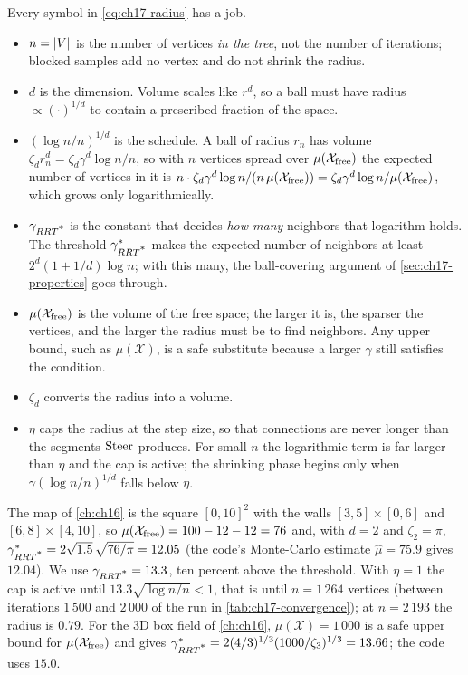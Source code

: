 Every symbol in \cref{eq:ch17-radius} has a job.
\begin{itemize}
  \item $n=\left\lvert V \right\rvert$ is the number of vertices \emph{in the tree}, not the
  number of iterations; blocked samples add no vertex and do not shrink the
  radius.
  \item $d$ is the dimension. Volume scales like $r^d$, so a ball must have
  radius $\propto(\cdot)^{1/d}$ to contain a prescribed fraction of the space.
  \item $(\log n/n)^{1/d}$ is the schedule. A ball of radius $r_n$ has volume
  $\zeta_d r_n^d=\zeta_d\gamma^d\log n/n$, so with $n$ vertices spread over
  $\mu(\mathcal{X}_{\mathrm{free}})$ the expected number of vertices in it is
  $n\cdot\zeta_d\gamma^d\log n/(n\,\mu(\mathcal{X}_{\mathrm{free}}))=\zeta_d\gamma^d\log n/\mu(\mathcal{X}_{\mathrm{free}})$,
  which grows only logarithmically.
  \item $\gamma_{RRT\textsuperscript{*}}$ is the constant that decides \emph{how many}
  neighbors that logarithm holds. The threshold $\gamma^*_{RRT\textsuperscript{*}}$ makes
  the expected number of neighbors at least $2^d(1+1/d)\log n$; with this
  many, the ball-covering argument of \cref{sec:ch17-properties} goes through.
  \item $\mu(\mathcal{X}_{\mathrm{free}})$ is the volume of the free space; the larger it is, the
  sparser the vertices, and the larger the radius must be to find neighbors.
  Any upper bound, such as $\mu(\mathcal{X})$, is a safe substitute because a
  larger $\gamma$ still satisfies the condition.
  \item $\zeta_d$ converts the radius into a volume.
  \item $\eta$ caps the radius at the step size, so that connections are
  never longer than the segments $\operatorname{Steer}$ produces. For small $n$ the
  logarithmic term is far larger than $\eta$ and the cap is active; the
  shrinking phase begins only when $\gamma(\log n/n)^{1/d}$ falls below
  $\eta$.
\end{itemize}

\begin{example}
\label{ex:ch17-gamma}
The map of \cref{ch:ch16} is the square $[0,10]^2$ with the walls
$[3,5]\times[0,6]$ and $[6,8]\times[4,10]$, so $\mu(\mathcal{X}_{\mathrm{free}})=100-12-12=76$
and, with $d=2$ and $\zeta_2=\pi$,
$\gamma^*_{RRT\textsuperscript{*}}=2\sqrt{1.5}\,\sqrt{76/\pi}=12.05$ (the code's
Monte-Carlo estimate $\hat\mu=75.9$ gives $12.04$). We use
$\gamma_{RRT\textsuperscript{*}}=13.3$, ten percent above the threshold. With $\eta=1$ the
cap is active until $13.3\sqrt{\log n/n}<1$, that is until $n=1\,264$
vertices (between iterations $1\,500$ and $2\,000$ of the run in
\cref{tab:ch17-convergence}); at $n=2\,193$ the radius is $0.79$. For the 3D
box field of \cref{ch:ch16}, $\mu(\mathcal{X})=1\,000$ is a safe upper bound
for $\mu(\mathcal{X}_{\mathrm{free}})$ and gives $\gamma^*_{RRT\textsuperscript{*}}=2(4/3)^{1/3}(1000/\zeta_3)^{1/3}=13.66$;
the code uses $15.0$.
\end{example}

